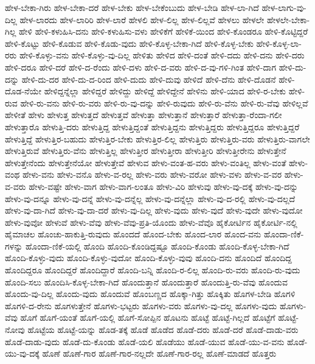 {ಹೇಳ-ಬೇಕಾ-ಗಿರು
ಹೇಳ-ಬೇಕಾ-ದರೆ
ಹೇಳ-ಬೇಕು
ಹೇಳ-ಬೇಕೆಂಬುದು
ಹೇಳ-ಬೇಡಿ
ಹೇಳ-ಲಾ-ಗಿದೆ
ಹೇಳ-ಲಾಗು-ವು-ದಿಲ್ಲ
ಹೇಳ-ಲಾರದು
ಹೇಳ-ಲಾರಿರಿ
ಹೇಳ-ಲಾರೆ
ಹೇಳಲಿ
ಹೇಳ-ಲಿಲ್ಲ
ಹೇಳ-ಲಿಲ್ಲವೆ
ಹೇಳಲು
ಹೇಳಲೇ
ಹೇಳಲೇ-ಬೇಕಾ-ಗಿಲ್ಲ
ಹೇಳಿ
ಹೇಳಿ-ಕಳುಹಿಸಿ-ದನು
ಹೇಳಿ-ಕಳುಹಿಸು-ವಳು
ಹೇಳಿಕೆಗೆ
ಹೇಳಿಕೆ-ಯಿಂದ
ಹೇಳಿ-ಕೊಂಡರೂ
ಹೇಳಿ-ಕೊಟ್ಟಿದ್ದರೆ
ಹೇಳಿ-ಕೊಟ್ಟು
ಹೇಳಿ-ಕೊಡುವ
ಹೇಳಿ-ಕೊಡು-ವುದು
ಹೇಳಿ-ಕೊಳ್ಳ-ಬೇಕಾ-ಗಿದೆ
ಹೇಳಿ-ಕೊಳ್ಳ-ಬೇಕು
ಹೇಳಿ-ಕೊಳ್ಳ-ಲಾ-ರರು
ಹೇಳಿ-ಕೊಳ್ಳು-ವನು
ಹೇಳಿ-ಕೊಳ್ಳು-ವು-ದಿಲ್ಲ
ಹೇಳಿತು
ಹೇಳಿದ
ಹೇಳಿ-ದಂತೆ
ಹೇಳಿ-ದದು
ಹೇಳಿ-ದನು
ಹೇಳಿ-ದರು
ಹೇಳಿ-ದರೂ
ಹೇಳಿ-ದರೆ
ಹೇಳಿ-ದ-ರೆಂದು
ಹೇಳಿ-ದಳು
ಹೇಳಿ-ದ-ವರು
ಹೇಳಿ-ದ-ವು-ಗಳಿ-ಗಿಂತ
ಹೇಳಿ-ದಾಗ
ಹೇಳಿ-ದು-ದನ್ನು
ಹೇಳಿ-ದು-ದರ
ಹೇಳಿ-ದು-ದ-ರಿಂದ
ಹೇಳಿ-ದುದು
ಹೇಳಿ-ದುವು
ಹೇಳಿದೆ
ಹೇಳಿ-ದೆನು
ಹೇಳಿ-ದೊಡನೆ
ಹೇಳಿ-ದೊಡ-ನೆಯೇ
ಹೇಳಿದ್ದನ್ನೆಲ್ಲಾ
ಹೇಳಿದ್ದರೆ
ಹೇಳಿದ್ದು
ಹೇಳಿದ್ದೆ
ಹೇಳಿದ್ದೇನೆ
ಹೇಳಿನು
ಹೇಳಿ-ಯಾದ
ಹೇಳಿ-ರ-ಬೇಕು
ಹೇಳಿ-ರುವ
ಹೇಳಿ-ರು-ವನು
ಹೇಳಿ-ರು-ವರು
ಹೇಳಿ-ರು-ವು-ದನ್ನು
ಹೇಳಿ-ರುವುದು
ಹೇಳಿ-ರು-ವೆನು
ಹೇಳಿ-ರು-ವೆವು
ಹೇಳಿಲ್ಲವೆ
ಹೇಳೀತೆ
ಹೇಳು
ಹೇಳುತ್ತ
ಹೇಳುತ್ತದೆ
ಹೇಳುತ್ತವೆ
ಹೇಳುತ್ತಾ
ಹೇಳುತ್ತಾನೆ
ಹೇಳುತ್ತಾರೆ
ಹೇಳುತ್ತಾ-ರೆಂದಾ-ಗಲೀ
ಹೇಳುತ್ತಾರೊ
ಹೇಳುತ್ತಿ-ದರು
ಹೇಳುತ್ತಿದ್ದ
ಹೇಳುತ್ತಿದ್ದಂತೆ
ಹೇಳುತ್ತಿದ್ದನು
ಹೇಳುತ್ತಿದ್ದರು
ಹೇಳುತ್ತಿದ್ದರೂ
ಹೇಳುತ್ತಿದ್ದರೆ
ಹೇಳುತ್ತಿದ್ದೆ
ಹೇಳುತ್ತಿರ-ಬಹುದು
ಹೇಳುತ್ತಿರ-ಬೇಕು
ಹೇಳುತ್ತಿರ-ಲಿಲ್ಲ
ಹೇಳುತ್ತಿರು
ಹೇಳುತ್ತಿರು-ವರು
ಹೇಳುತ್ತಿರು-ವಾಗಲೇ
ಹೇಳುತ್ತಿರುವೆ
ಹೇಳುತ್ತಿರು-ವೆನು
ಹೇಳುತ್ತಿಲ್ಲ
ಹೇಳುತ್ತೀರ
ಹೇಳುತ್ತೀರಾ
ಹೇಳುತ್ತೀರಿ
ಹೇಳುತ್ತೀರೇನು
ಹೇಳುತ್ತೇನೆ
ಹೇಳುತ್ತೇನೆಂದು
ಹೇಳುತ್ತೇನೆಯೋ
ಹೇಳುತ್ತೇವೆ
ಹೇಳುವ
ಹೇಳು-ವಂತ-ಹ-ವರು
ಹೇಳು-ವಂತಿಲ್ಲ
ಹೇಳು-ವಂತೆ
ಹೇಳು-ವಂಥ
ಹೇಳು-ವನು
ಹೇಳು-ವನೊ
ಹೇಳು-ವ-ರಲ್ಲ
ಹೇಳು-ವರು
ಹೇಳು-ವರೋ
ಹೇಳು-ವಳು
ಹೇಳು-ವ-ವರ
ಹೇಳು-ವ-ವರು
ಹೇಳು-ವಷ್ಟೇ
ಹೇಳು-ವಾಗ
ಹೇಳು-ವಾಗ-ಲಂತೂ
ಹೇಳು-ವಿರಿ
ಹೇಳುವು
ಹೇಳು-ವು-ದಕ್ಕೆ
ಹೇಳು-ವು-ದನ್ನು
ಹೇಳು-ವು-ದನ್ನೂ
ಹೇಳು-ವು-ದನ್ನೆ
ಹೇಳು-ವು-ದನ್ನೆಲ್ಲ
ಹೇಳು-ವು-ದನ್ನೆಲ್ಲಾ
ಹೇಳು-ವು-ದ-ರಲ್ಲಿ
ಹೇಳು-ವು-ದಲ್ಲದೆ
ಹೇಳು-ವು-ದಾ-ಗಿದೆ
ಹೇಳು-ವು-ದಾ-ದರೆ
ಹೇಳು-ವು-ದಿಲ್ಲ
ಹೇಳು-ವುದು
ಹೇಳು-ವುದೆ
ಹೇಳು-ವುದೇ
ಹೇಳು-ವುದೋ
ಹೇಳು-ವುವೋ
ಹೇಳುವೆ
ಹೇಳು-ವೆವು
ಹೇಳು-ವೆವು-ಪ್ರತಿ-ಯೊಂದು
ಹೇಳು-ವೆವೊ
ಹೈಕೋರ್ಟಿನ
ಹೈಕೋರ್ಟಿ-ನಲ್ಲಿ
ಹೈಮಾಚಲ
ಹೊಂಚು-ಹಾಕುತ್ತಿ-ರುವುದು
ಹೊಂದದೆ
ಹೊಂದ-ಬೇಕು
ಹೊಂದ-ಲಾರ
ಹೊಂದ-ವನು
ಹೊಂದಾ-ಣಿಕೆ-ಗಳನ್ನು
ಹೊಂದಾ-ಣಿಕೆ-ಯಲ್ಲಿ
ಹೊಂದಿ
ಹೊಂದಿ-ಕೊಂಡಿದ್ದಷ್ಟೂ
ಹೊಂದಿ-ಕೊಂಡು
ಹೊಂದಿ-ಕೊಳ್ಳ-ಬೇಕಾ-ಗಿದೆ
ಹೊಂದಿ-ಕೊಳ್ಳು-ವುದು
ಹೊಂದಿ-ಕೊಳ್ಳು-ವುದೋ
ಹೊಂದಿ-ಕೊಳ್ಳು-ವುವು
ಹೊಂದಿ-ದನು
ಹೊಂದಿದೆ
ಹೊಂದಿದ್ದ
ಹೊಂದಿದ್ದರೂ
ಹೊಂದಿದ್ದರೆ
ಹೊಂದಿದ್ದಾರೆ
ಹೊಂದಿ-ಬನ್ನಿ
ಹೊಂದಿ-ರ-ಲಿಲ್ಲ
ಹೊಂದಿ-ರು-ವರು
ಹೊಂದಿ-ರು-ವುದು
ಹೊಂದಿ-ಸಲು
ಹೊಂದಿಸಿ-ಕೊಳ್ಳ-ಬೇಕಾ-ಗಿದೆ
ಹೊಂದುತ್ತಾನೆ
ಹೊಂದುತ್ತಾರೆ
ಹೊಂದುತ್ತಿ-ರು-ವೆವು
ಹೊಂದುವ
ಹೊಂದು-ವು-ದಿಲ್ಲ
ಹೊಂದು-ವುದು
ಹೊಂದುವೆ
ಹೊಂಬಣ್ಣದ
ಹೊಕ್ಕಾ-ಗಿತ್ತು
ಹೊಕ್ಕಿತು
ಹೊಗಳ-ಬೇಡಿ
ಹೊಗಳಿ
ಹೊಗಳಿ-ದ-ರೇನು
ಹೊಗಳುತ್ತೇನೆ
ಹೊಗಳು-ಭಟ್ಟರು
ಹೊಗಳು-ವರು
ಹೊಗಳು-ವು-ದಲ್ಲ
ಹೊಗಳು-ವುದು
ಹೊಗಳು-ವೆವು
ಹೊಗೆ
ಹೊಗೆ-ಯಂತೆ
ಹೊಗೆ-ಯಲ್ಲಿ
ಹೊಗೆ-ಸೋಪ್ಪಿನ
ಹೊಟನು
ಹೊಟ್ಟೆ
ಹೊಟ್ಟೆ-ಗಿಲ್ಲದೆ
ಹೊಟ್ಟೆಗೆ
ಹೊಟ್ಟೆ-ನೋವು
ಹೊಟ್ಟೆಯ
ಹೊಟ್ಟೆ-ಯನ್ನು
ಹೊಡ-ತಕ್ಕೆ
ಹೊಡೆ
ಹೊಡೆದ
ಹೊಡೆ-ದರು
ಹೊಡೆ-ದರೆ
ಹೊಡೆ-ದಾಡು-ವರು
ಹೊಡೆ-ದಾಡು-ವುದು
ಹೊಡೆ-ದು-ಕೊಂಡು
ಹೊಡೆ-ಯಲಿ
ಹೊಡೆಯು
ಹೊಡೆ-ಯುವ
ಹೊಡೆ-ಯು-ವ-ವನು
ಹೊಡೆ-ಯು-ವು-ದಕ್ಕೆ
ಹೊಣೆ
ಹೊಣೆ-ಗಾರ
ಹೊಣೆ-ಗಾರ-ನಲ್ಲದೇ
ಹೊಣೆ-ಗಾರ-ರಲ್ಲ
ಹೊಣೆ-ಮಾಡದೆ
ಹೊತ್ತರು
}
